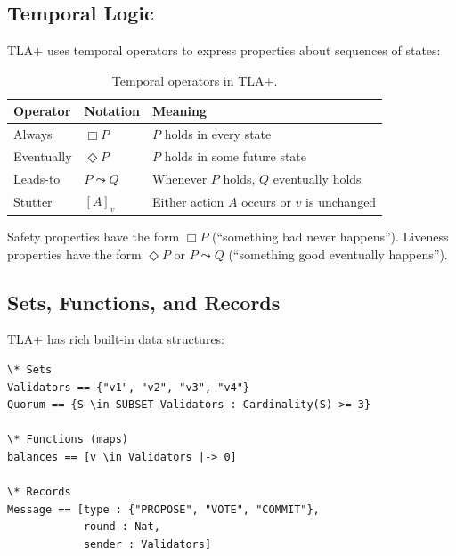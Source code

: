 \subsection{Temporal Logic}

TLA+ uses temporal operators to express properties about sequences of states:

\begin{table}[H]
\centering
\small
\begin{tabular}{@{}lll@{}}
\toprule
\textbf{Operator} & \textbf{Notation} & \textbf{Meaning} \\
\midrule
Always & $\Box P$ & $P$ holds in every state \\
Eventually & $\Diamond P$ & $P$ holds in some future state \\
Leads-to & $P \leadsto Q$ & Whenever $P$ holds, $Q$ eventually holds \\
Stutter & $[A]_v$ & Either action $A$ occurs or $v$ is unchanged \\
\bottomrule
\end{tabular}
\caption{Temporal operators in TLA+.}
\end{table}

Safety properties have the form $\Box P$ (``something bad never happens'').
Liveness properties have the form $\Diamond P$ or $P \leadsto Q$ (``something good
eventually happens'').

\subsection{Sets, Functions, and Records}

TLA+ has rich built-in data structures:

\begin{lstlisting}[language=TLA,caption={TLA+ data structures}]
\* Sets
Validators == {"v1", "v2", "v3", "v4"}
Quorum == {S \in SUBSET Validators : Cardinality(S) >= 3}

\* Functions (maps)
balances == [v \in Validators |-> 0]

\* Records
Message == [type : {"PROPOSE", "VOTE", "COMMIT"},
            round : Nat,
            sender : Validators]
\end{lstlisting}

